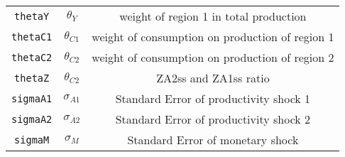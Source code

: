\begin{center}
\begin{longtable}{ccc}
\texttt{thetaY} & ${\theta_{Y}}$ & weight of region 1 in total production\\
\texttt{thetaC1} & ${\theta_{C1}}$ & weight of consumption on production of region 1\\
\texttt{thetaC2} & ${\theta_{C2}}$ & weight of consumption on production of region 2\\
\texttt{thetaZ} & ${\theta_{C2}}$ & ZA2ss and ZA1ss ratio\\
\texttt{sigmaA1} & ${\sigma_{A1}}$ & Standard Error of productivity shock 1\\
\texttt{sigmaA2} & ${\sigma_{A2}}$ & Standard Error of productivity shock 2\\
\texttt{sigmaM} & ${\sigma_M}$ & Standard Error of monetary shock\\
\hline%
\end{longtable}
\end{center}

